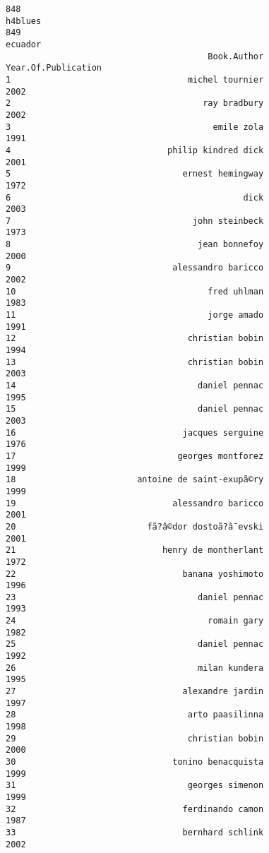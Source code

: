 \documentclass[
]{report}
\begin{document}
\begin{verbatim}
848                                                                                                 h4blues
849                                                                                                 ecuador
                                        Book.Author Year.Of.Publication
1                                   michel tournier                2002
2                                      ray bradbury                2002
3                                        emile zola                1991
4                               philip kindred dick                2001
5                                  ernest hemingway                1972
6                                              dick                2003
7                                    john steinbeck                1973
8                                     jean bonnefoy                2000
9                                alessandro baricco                2002
10                                      fred uhlman                1983
11                                      jorge amado                1991
12                                  christian bobin                1994
13                                  christian bobin                2003
14                                    daniel pennac                1995
15                                    daniel pennac                2003
16                                 jacques serguine                1976
17                                georges montforez                1999
18                        antoine de saint-exupã©ry                1999
19                               alessandro baricco                2001
20                          fã?â©dor dostoã?â¯evski                2001
21                             henry de montherlant                1972
22                                 banana yoshimoto                1996
23                                    daniel pennac                1993
24                                      romain gary                1982
25                                    daniel pennac                1992
26                                    milan kundera                1995
27                                 alexandre jardin                1997
28                                  arto paasilinna                1998
29                                  christian bobin                2000
30                               tonino benacquista                1999
31                                  georges simenon                1999
32                                 ferdinando camon                1987
33                                 bernhard schlink                2002

\end{verbatim}
\end{document}
